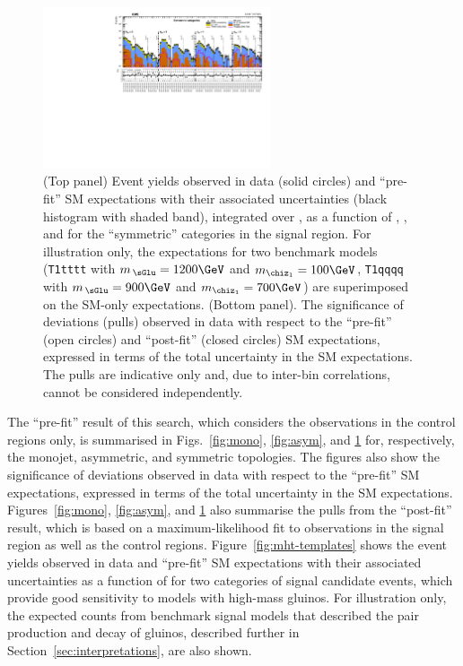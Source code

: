 \begin{figure}[!h]
  \begin{center}
    \includegraphics[angle=90,width=0.6\textwidth]{figures/result/v1/summaryPlot_Symmetric_prefit_overlay_fit_b}
    \caption{(Top panel) Event yields observed in data (solid circles)
      and ``pre-fit'' SM expectations with their associated
      uncertainties (black histogram with shaded band), integrated
      over \HTmiss, as a function of \njet, \nb, and \scalht for the
      ``symmetric'' \njet categories in the signal region. For
      illustration only, the expectations for two benchmark models
      (\texttt{T1tttt} with $m_{\,\sGlu} = 1200\GeV$ and $m_{\chiz_1}
      = 100\GeV$, \texttt{T1qqqq} with $m_{\,\sGlu} = 900\GeV$ and
      $m_{\chiz_1} = 700\GeV$) are superimposed on the SM-only
      expectations. (Bottom panel). The significance of deviations
      (pulls) observed in data with respect to the ``pre-fit'' (open
      circles) and ``post-fit'' (closed circles) SM expectations,
      expressed in terms of the total uncertainty in the SM
      expectations. The pulls are indicative only and, due to
      inter-bin correlations, cannot be considered independently.}
    \label{fig:sym}
  \end{center}
\end{figure}

The ``pre-fit'' result of this search, which considers the
observations in the control regions only, is summarised in
Figs.~\ref{fig:mono}, \ref{fig:asym}, and \ref{fig:sym} for,
respectively, the monojet, asymmetric, and symmetric topologies. 
The figures also show the significance of deviations observed in data
with respect to the ``pre-fit'' SM expectations, expressed in terms of
the total uncertainty in the SM expectations. Figures~\ref{fig:mono},
\ref{fig:asym}, and \ref{fig:sym} also summarise the pulls from the
``post-fit'' result, which is based on a maximum-likelihood fit to
observations in the signal region as well as the control regions.
Figure~\ref{fig:mht-templates} shows the event yields observed in data
and ``pre-fit'' SM expectations with their associated uncertainties as
a function of \HTmiss for two categories of signal candidate events,
which provide good sensitivity to models with high-mass gluinos. For
illustration only, the expected counts from benchmark signal models
that described the pair production and decay of gluinos, described
further in Section~\ref{sec:interpretations}, are also shown.

